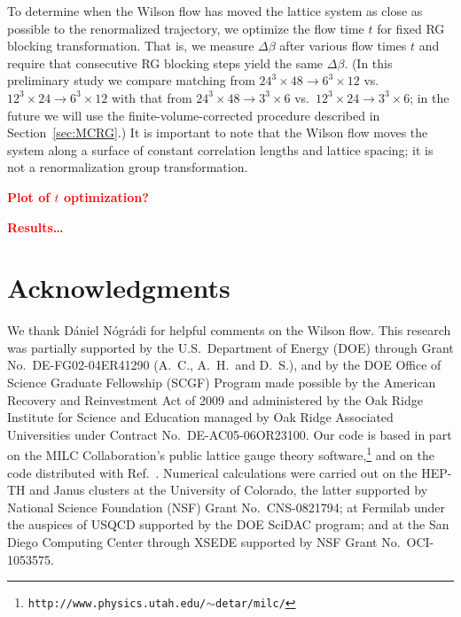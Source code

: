 \documentclass{PoS}
\newcommand{\be}{\ensuremath{\beta} }
\newcommand{\De}{\ensuremath{\Delta} }
\newcommand{\X}{\ensuremath{\!\times\!} }
\newcommand{\refcite}[1]{Ref.~\cite{#1}}
\newcommand{\secref}[1]{Section~\ref{#1}}
\newcommand{\TODO}[1]{\textcolor{red}{{\bf #1}}}
\begin{document}
To determine when the Wilson flow has moved the lattice system as close as possible to the renormalized trajectory, we optimize the flow time $t$ for fixed RG blocking transformation.
That is, we measure $\De\be$ after various flow times $t$ and require that consecutive RG blocking steps yield the same $\De\be$.
(In this preliminary study we compare matching from $24^3\X48 \to 6^3\X12$ vs.\ $12^3\X24 \to 6^3\X12$ with that from $24^3\X48 \to 3^3\X6$ vs.\ $12^3\X24 \to 3^3\X6$; in the future we will use the finite-volume-corrected procedure described in \secref{sec:MCRG}.)
It is important to note that the Wilson flow moves the system along a surface of constant correlation lengths and lattice spacing; it is not a renormalization group transformation.

\TODO{Plot of $t$ optimization?}

\TODO{Results\dots}



\section*{Acknowledgments} %
We thank D\'aniel N\'ogr\'adi for helpful comments on the Wilson flow.
This research was partially supported by the U.S.~Department of Energy (DOE) through Grant No.~DE-FG02-04ER41290 (A.~C., A.~H.\ and D.~S.), and by the DOE Office of Science Graduate Fellowship (SCGF) Program made possible by the American Recovery and Reinvestment Act of 2009 and administered by the Oak Ridge Institute for Science and Education managed by Oak Ridge Associated Universities under Contract No.~DE-AC05-06OR23100.
Our code is based in part on the MILC Collaboration's public lattice gauge theory software,\footnote{\texttt{http://www.physics.utah.edu/$\sim$detar/milc/}} and on the code distributed with \refcite{Borsanyi:2012zs}.
Numerical calculations were carried out on the HEP-TH and Janus clusters at the University of Colorado, the latter supported by National Science Foundation (NSF) Grant No.~CNS-0821794; at Fermilab under the auspices of USQCD supported by the DOE SciDAC program; and at the San Diego Computing Center through XSEDE supported by NSF Grant No.~OCI-1053575.





\end{document}
